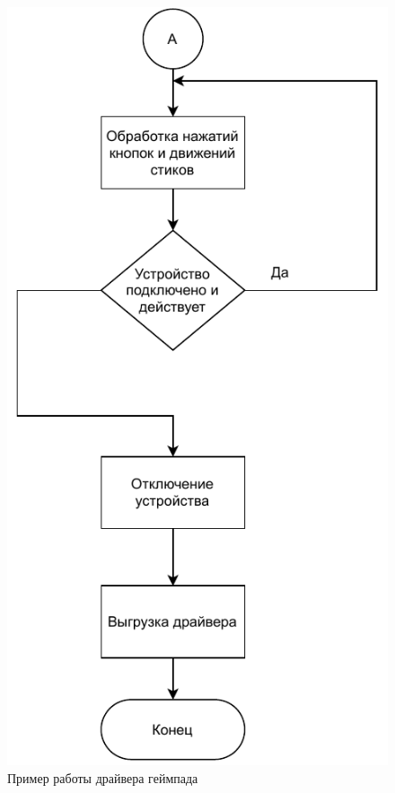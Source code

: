 \begin{figure}[h!]
	\centering
	\includegraphics[scale=1.4]{img/driver-work2.pdf}
	\caption{Пример работы драйвера геймпада}
	\label{driver-work2}
\end{figure}

\pagebreak